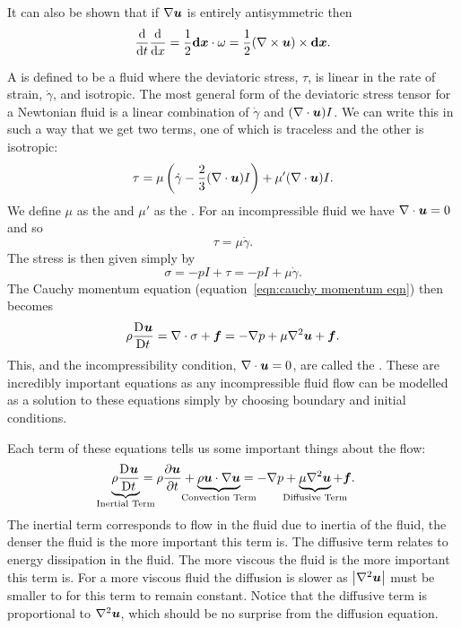 \documentclass[a4paper]{article}
\renewcommand{\ident}{I}
\newcommand{\vd}[1]{\vv{\mathrm{d}{#1}}}
\newcommand{\mdv}[3][]{\frac{\mathrm{D}^{#1} #2}{\mathrm{D} {#3}^{#1}}}
\begin{document}
    It can also be shown that if \(\nabla\bm{u}\) is entirely antisymmetric then
    \[\dv{t}\dv{x} = \frac{1}{2}\vd{x}\cdot\omega = \frac{1}{2}(\curl\vv{u})\times\vd{x}.\]
    
    A  is defined to be a fluid where the deviatoric stress, \(\tau\), is linear in the rate of strain, \(\dot{\gamma}\), and isotropic.
    The most general form of the deviatoric stress tensor for a Newtonian fluid is a linear combination of \(\dot{\gamma}\) and \((\div\vv{u})\ident\).
    We can write this in such a way that we get two terms, one of which is traceless and the other is isotropic:
    \[\tau = \mu\left( \dot{\gamma} - \frac{2}{3}(\div\vv{u})\ident \right) + \mu'(\div\vv{u})\ident.\]
    We define \(\mu\) as the  and \(\mu'\) as the .
    For an incompressible fluid we have \(\nabla\cdot\bm{u} = 0\) and so
    \[\tau = \mu\dot{\gamma}.\]
    The stress is then given simply by
    \[\sigma = -p\ident + \tau = -p\ident + \mu\dot{\gamma}.\]
    The Cauchy momentum equation (equation~\ref{eqn:cauchy momentum eqn}) then becomes
    \[\rho\mdv{\vv{u}}{t} = \div\sigma + \vv{f} = -\grad p + \mu\laplacian\vv{u} + \vv{f}.\]
    This, and the incompressibility condition, \(\nabla\cdot\bm{u} = 0\), are called the .
    These are incredibly important equations as any incompressible fluid flow can be modelled as a solution to these equations simply by choosing boundary and initial conditions.
    
    Each term of these equations tells us some important things about the flow:
    \[\underbrace{\rho\mdv{\vv{u}}{t}}_{\mathclap{\text{Inertial Term}}} = \rho\pdv{\vv{u}}{t} + \underbrace{\rho\vv{u}\cdot\grad\vv{u}}_{\mathclap{\text{Convection Term}}} = -\grad p + \underbrace{\mu\laplacian\vv{u}}_{\mathclap{\text{Diffusive Term}}} + \vv{f}.\]
    The inertial term corresponds to flow in the fluid due to inertia of the fluid, the denser the fluid is the more important this term is.
    The diffusive term relates to energy dissipation in the fluid.
    The more viscous the fluid is the more important this term is.
    For a more viscous fluid the diffusion is slower as \(\abs{\nabla^2\bm{u}}\) must be smaller to for this term to remain constant.
    Notice that the diffusive term is proportional to \(\nabla^2\bm{u}\), which should be no surprise from the diffusion equation.
    
\end{document}
